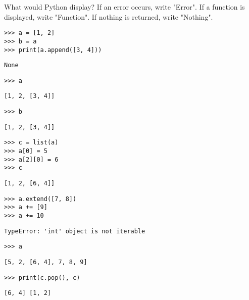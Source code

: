 \begin{blocksection}
\question What would Python display? If an error occurs, write "Error". If a function is displayed, write "Function". If nothing is returned, write "Nothing".

\begin{lstlisting}
>>> a = [1, 2]
>>> b = a
>>> print(a.append([3, 4]))
\end{lstlisting}
\begin{solution}[0.25in]
\begin{lstlisting}
None
\end{lstlisting}
\end{solution}

\begin{lstlisting}
>>> a
\end{lstlisting}
\begin{solution}[0.25in]
\begin{lstlisting}
[1, 2, [3, 4]]
\end{lstlisting}
\end{solution}

\begin{lstlisting}
>>> b
\end{lstlisting}
\begin{solution}[0.25in]
\begin{lstlisting}
[1, 2, [3, 4]]
\end{lstlisting}
\end{solution}

\begin{lstlisting}
>>> c = list(a)
>>> a[0] = 5
>>> a[2][0] = 6
>>> c
\end{lstlisting}
\begin{solution}[0.25in]
\begin{lstlisting}
[1, 2, [6, 4]]
\end{lstlisting}
\end{solution}

\begin{lstlisting}
>>> a.extend([7, 8])
>>> a += [9]
>>> a += 10
\end{lstlisting}
\begin{solution}[0.25in]
\begin{lstlisting}
TypeError: 'int' object is not iterable
\end{lstlisting}
\end{solution}

\begin{lstlisting}
>>> a
\end{lstlisting}
\begin{solution}[0.25in]
\begin{lstlisting}
[5, 2, [6, 4], 7, 8, 9]
\end{lstlisting}
\end{solution}
\end{blocksection}
\begin{blocksection}
\begin{lstlisting}
>>> print(c.pop(), c)
\end{lstlisting}
\begin{solution}[0.25in]
\begin{lstlisting}
[6, 4] [1, 2]
\end{lstlisting}
\end{solution}
\end{blocksection}